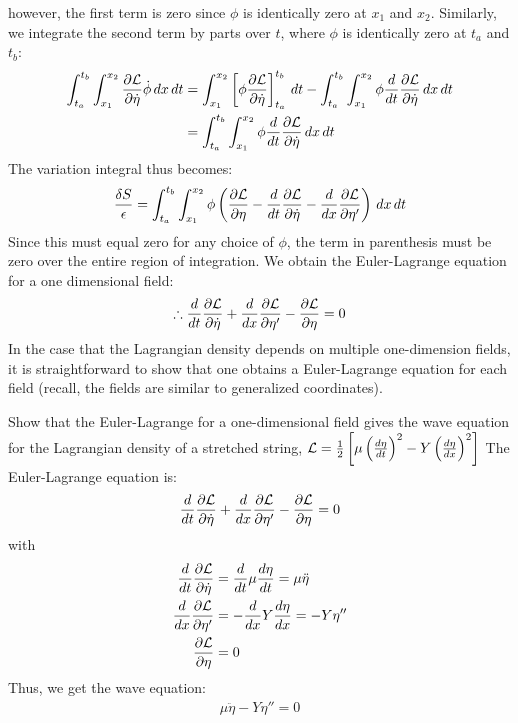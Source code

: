 however, the first term is zero since $\phi$ is identically zero at $x_1$ and $x_2$. Similarly, we integrate the second term by parts over $t$, where $\phi$ is identically zero at $t_a$ and $t_b$:
\begin{align}
\int_{t_a}^{t_b} \int_{x_1}^{x_2}\frac{\partial \mathcal{L}}{\partial \dot\eta}\dot\phi \,dx\,dt&=\int_{x_1}^{x_2}\left[\phi\frac{\partial \mathcal{L}}{\partial \dot\eta}\right]_{t_a}^{t_b}\,dt-\int_{t_a}^{t_b} \int_{x_1}^{x_2}\phi\frac{d}{dt}\frac{\partial \mathcal{L}}{\partial \dot\eta} \,dx\,dt\nonumber\\
&=\int_{t_a}^{t_b} \int_{x_1}^{x_2}\phi\frac{d}{dt}\frac{\partial \mathcal{L}}{\partial \dot\eta} \,dx\,dt
\end{align}
The variation integral thus becomes:
\begin{align}
\frac{\delta S}{\epsilon}=\int_{t_a}^{t_b} \int_{x_1}^{x_2} \phi \left(\frac{\partial \mathcal{L}}{\partial \eta}-\frac{d}{dt}\frac{\partial \mathcal{L}}{\partial \dot\eta}- \frac{d}{dx}\frac{\partial \mathcal{L}}{\partial \eta'} \right)\,dx\,dt
\end{align}
Since this must equal zero for any choice of $\phi$, the term in parenthesis must be zero over the entire region of integration. We obtain the Euler-Lagrange equation for a one dimensional field:
\begin{align}
\therefore \frac{d}{dt}\frac{\partial \mathcal{L}}{\partial \dot\eta}+\frac{d}{dx}\frac{\partial \mathcal{L}}{\partial \eta'}-\frac{\partial \mathcal{L}}{\partial \eta}=0
\end{align}
In the case that the Lagrangian density depends on multiple one-dimension fields, it is straightforward to show that one obtains a Euler-Lagrange equation for each field (recall, the fields are similar to generalized coordinates). 

\begin{example}{0pt}{Show that the Euler-Lagrange for a one-dimensional field gives the wave equation for the Lagrangian density of a stretched string, $\mathcal{L}=\frac{1}{2}\left[\mu\left(\frac{d\eta}{dt}\right)^2-Y\left(\frac{d\eta}{dx}\right)^2\right]$}{}
The Euler-Lagrange equation is:
\begin{align*}
\frac{d}{dt}\frac{\partial \mathcal{L}}{\partial \dot\eta}+\frac{d}{dx}\frac{\partial \mathcal{L}}{\partial \eta'}-\frac{\partial \mathcal{L}}{\partial \eta}=0
\end{align*}
with
\begin{align*}
\frac{d}{dt}\frac{\partial \mathcal{L}}{\partial \dot\eta}&=\frac{d}{dt}\mu\frac{d\eta}{dt}=\mu\ddot\eta\\
\frac{d}{dx}\frac{\partial \mathcal{L}}{\partial \eta'}&=-\frac{d}{dx}Y\frac{d\eta}{dx}=-Y\eta''\\
\frac{\partial \mathcal{L}}{\partial \eta}&=0
\end{align*}
Thus, we get the wave equation:
\begin{align*}
\mu\ddot\eta-Y\eta''=0
\end{align*}
\end{example}


